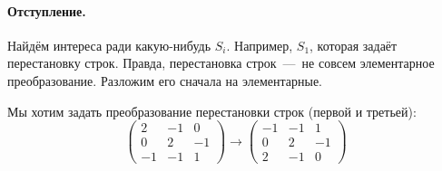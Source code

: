 \documentclass[a4paper,12pt]{article}
\begin{document}
\begin{solution}
    \bigskip
    
    \paragraph{Отступление.}
    
    Найдём интереса ради какую-нибудь $S_i$.
    Например, $S_1$, которая задаёт перестановку строк.
    Правда, перестановка строк~---~не совсем элементарное преобразование.
    Разложим его сначала на элементарные.
    
    Мы хотим задать преобразование перестановки строк (первой и третьей):
    \[
      \begin{pmatrix}
        2 & -1 & 0\\
        0 & 2 & -1\\
        -1 & -1 & 1
      \end{pmatrix}
      \longrightarrow \begin{pmatrix}
        -1 & -1 & 1\\
        0 & 2 & -1\\
        2 & -1 & 0
      \end{pmatrix}
    \]
    

\end{solution}
\end{document}
